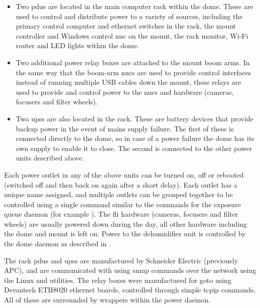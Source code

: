 \begin{colsection}
\begin{colsection}
\begin{itemize}
    \item Two \glspl{pdu} are located in the main computer rack within the dome. These are used to control and distribute power to a variety of sources, including the primary control computer and ethernet switches in the rack, the mount controller and Windows control \gls{nuc} on the mount, the rack monitor, Wi-Fi router and LED lights within the dome.
    \item Two additional power relay boxes are attached to the mount boom arms. In the same way that the boom-arm \glspl{nuc} are used to provide control interfaces instead of running multiple USB cables down the mount, these relays are used to provide and control power to the \glspl{nuc} and hardware (cameras, focusers and filter wheels).
    \item Two \glspl{ups} are also located in the rack. These are battery devices that provide backup power in the event of mains supply failure. The first of these is connected directly to the dome, so in case of a power failure the dome has its own supply to enable it to close. The second is connected to the other power units described above.
\end{itemize}

Each power outlet in any of the above units can be turned on, off or rebooted (switched off and then back on again after a short delay). Each outlet has a unique name assigned, and multiple outlets can be grouped together to be controlled using a single command similar to the commands for the exposure queue daemon (for example ). The \gls{fli} hardware (cameras, focusers and filter wheels) are usually powered down during the day, all other hardware including the dome and mount is left on. Power to the dehumidifier unit is controlled by the dome daemon as described in .

The rack \glspl{pdu} and \glspl{ups} are manufactured by Schneider Electric (previously APC), and are communicated with using \gls{snmp} commands over the network using the Linux  and  utilities. The relay boxes were manufactured for \gls{goto} using Devantech ETH8020 ethernet boards, controlled through simple \gls{tcpip} commands. All of these are surrounded by  wrappers within the power daemon.

\end{colsection}


\end{colsection}

